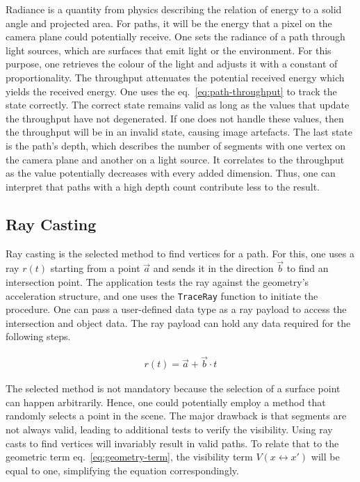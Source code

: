 Radiance is a quantity from physics describing the relation of energy to a solid angle and projected area.
For paths, it will be the energy that a pixel on the camera plane could potentially receive.
One sets the radiance of a path through light sources, which are surfaces that emit light or the environment.
For this purpose, one retrieves the colour of the light and adjusts it with a constant of proportionality.
The throughput attenuates the potential received energy which yields the received energy.
One uses the eq.~\ref{eq:path-throughput} to track the state correctly.
The correct state remains valid as long as the values that update the throughput have not degenerated.
If one does not handle these values, then the throughput will be in an invalid state, causing image artefacts.
The last state is the path's depth, which describes the number of segments with one vertex on the camera plane and another on a light source.
It correlates to the throughput as the value potentially decreases with every added dimension.
Thus, one can interpret that paths with a high depth count contribute less to the result.

\subsection*{Ray Casting}

Ray casting is the selected method to find vertices for a path.
For this, one uses a ray $r(t)$ starting from a point $\vec{a}$ and sends it in the direction $\vec{b}$ to find an intersection point.
The application tests the ray against the geometry's acceleration structure, and one uses the \texttt{TraceRay} function to initiate the procedure.
One can pass a user-defined data type as a ray payload to access the intersection and object data.
The ray payload can hold any data required for the following steps.

\begin{align*}
    r(t) = \vec{a} + \vec{b} \cdot t
\end{align*}

The selected method is not mandatory because the selection of a surface point can happen arbitrarily.
Hence, one could potentially employ a method that randomly selects a point in the scene.
The major drawback is that segments are not always valid, leading to additional tests to verify the visibility.
Using ray casts to find vertices will invariably result in valid paths.
To relate that to the geometric term eq.~\ref{eq:geometry-term}, the visibility term $V(x \leftrightarrow x')$ will be equal to one, simplifying the equation correspondingly.

